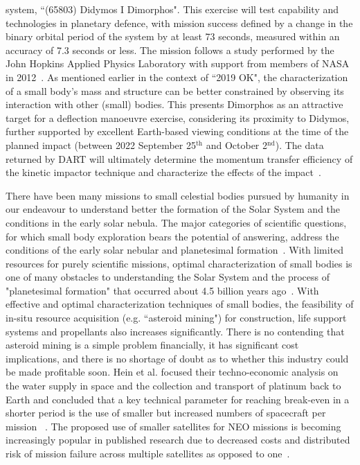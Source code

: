 system, ``(65803) Didymos I Dimorphos". This exercise will test  capability and technologies in planetary defence, with mission success defined by a change in the binary orbital period of the system by at least 73 seconds, measured within an accuracy of 7.3 seconds or less. The mission follows a study performed by the John Hopkins Applied Physics Laboratory with support from members of \gls{NASA} in 2012~\cite{Cheng2012}. As mentioned earlier in the context of ``2019 OK", the characterization of a small body's mass and structure can be better constrained by observing its interaction with other (small) bodies. This presents Dimorphos as an attractive target for a deflection manoeuvre exercise, considering its proximity to Didymos, further supported by excellent Earth-based viewing conditions at the time of the planned impact (between 2022 September 25$^{\text{th}}$ and October 2$^{\text{nd}}$). The data returned by \gls{DART} will ultimately determine the momentum transfer efficiency of the kinetic impactor technique and characterize the effects of the impact~\cite{Cheng2012, Rivkin2021}.

There have been many missions to small celestial bodies pursued by humanity in our endeavour to understand better the formation of the Solar System and the conditions in the early solar nebula. The major categories of scientific questions, for which small body exploration bears the potential of answering, address the conditions of the early solar nebular and planetesimal formation~\cite{Davidsson2021}. With limited resources for purely scientific missions, optimal characterization of small bodies is one of many obstacles to understanding the Solar System and the process of "planetesimal formation" that occurred about 4.5 billion years ago~\cite{Klahr2015}. With effective and optimal characterization techniques of small bodies, the feasibility of in-situ resource acquisition (e.g. ``asteroid mining") for construction, life support systems and propellants also increases significantly. There is no contending that asteroid mining is a simple problem financially, it has significant cost implications, and there is no shortage of doubt as to whether this industry could be made profitable soon. Hein et al. focused their techno-economic analysis on the water supply in space and the collection and transport of platinum back to Earth and concluded that a key technical parameter for reaching break-even in a shorter period is the use of smaller but increased numbers of spacecraft per mission ~\cite{Hein2020}. The proposed use of smaller satellites for \gls{NEO} missions is becoming increasingly popular in published research due to decreased costs and distributed risk of mission failure across multiple satellites as opposed to one~\cite{Wells2006, Laurin2008, Scott2013, Yu2014}.
